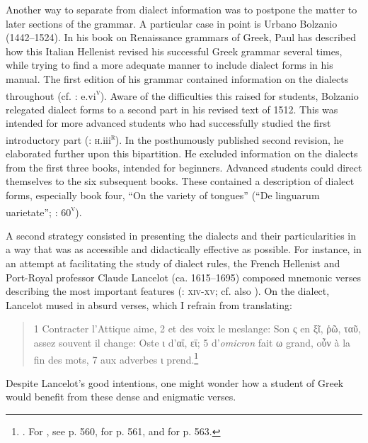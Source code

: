 Another way to separate  from dialect information was to postpone the matter to later sections of the grammar. A particular case in point is Urbano Bolzanio (1442–1524). In his book on Renaissance grammars of Greek, Paul \citet[36--40]{Botley2010} has described how this Italian Hellenist revised his successful Greek grammar several times, while trying to find a more adequate manner to include dialect forms in his manual. The first edition of his grammar contained information on the dialects throughout (cf. \citealt{Bolzanio1497}: e.vi\textsc{\textsuperscript{v}}). Aware of the difficulties this raised for students, Bolzanio relegated dialect forms to a second part in his revised text of 1512. This was intended for more advanced students who had successfully studied the first introductory part (\citealt{Bolzanio1512}: \textsc{h}.iii\textsc{\textsuperscript{r}}). In the posthumously published second revision, he elaborated further upon this bipartition. He excluded information on the dialects from the first three books, intended for beginners. Advanced students could direct themselves to the six subsequent books. These contained a description of dialect forms, especially book four, “On the variety of tongues” (“De linguarum uarietate”; \citealt{Bolzanio1545}: 60\textsc{\textsuperscript{v}}).

A second strategy consisted in presenting the dialects and their particularities in a way that was as accessible and didactically effective as possible. For instance, in an attempt at facilitating the study of dialect rules, the French Hellenist and Port-Royal professor Claude Lancelot (ca. 1615–1695) composed mnemonic verses describing the most important features (\citealt{Lancelot1655}: \textsc{xiv-xv;} cf. also \citealt{Anon.1725}). On the  dialect, Lancelot mused in absurd  verses, which I refrain from translating:

\begin{quote}\raggedright
1 Contracter l’Attique aime, 2 et des voix le meslange: Son ς en ξῖ, ῥῶ, ταῦ, assez souvent il change: Oste ι d’αϊ, εϊ; 5 d’\textit{omicron} fait ω grand, oὖν à la fin des mots, 7 aux adverbes ι prend.\footnote{\citet[558]{Lancelot1655}. For , see p. 560, for  p. 561, and for  p. 563.}
\end{quote}

Despite Lancelot’s good intentions, one might wonder how a student of Greek would benefit from these dense and enigmatic verses.

